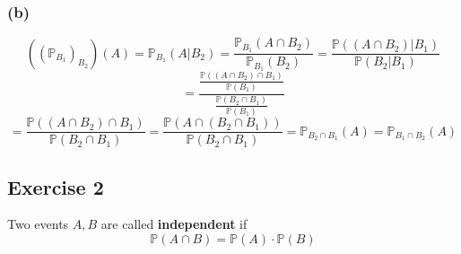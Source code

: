 \documentclass{article}
\begin{document}
\subsubsection*{(b)}

\[
    ((\mathbb{P}_{B_1})_{B_2})(A) = \mathbb{P}_{B_1} (A|B_2) = \frac{\mathbb{P}_{B_1}(A\cap B_2)}{\mathbb{P}_{B_1}(B_2)} = \frac{\mathbb{P}((A\cap B_2) | B_1)}{\mathbb{P}(B_2 | B_1)}
\]
\[
    = \frac{
        \frac{\mathbb{P}((A\cap B_2) \cap B_1)}{\mathbb{P}(B_1)}
    }{
        \frac{\mathbb{P}(B_2 \cap B_1)}{\mathbb{P}(B_1)}
    }
\]
\[
    = \frac{\mathbb{P}((A\cap B_2) \cap B_1)}{\mathbb{P}(B_2 \cap B_1)} = \frac{\mathbb{P}(A \cap (B_2 \cap B_1))}{\mathbb{P}(B_2 \cap B_1)} = \mathbb{P}_{B_2 \cap B_1}(A) = \mathbb{P}_{B_1 \cap B_2}(A)
\]

\subsection*{Exercise 2}

Two events $A, B$ are called \textbf{independent} if
\[
    \mathbb{P}(A \cap B) = \mathbb{P}(A) \cdot \mathbb{P}(B)
\]
\end{document}
